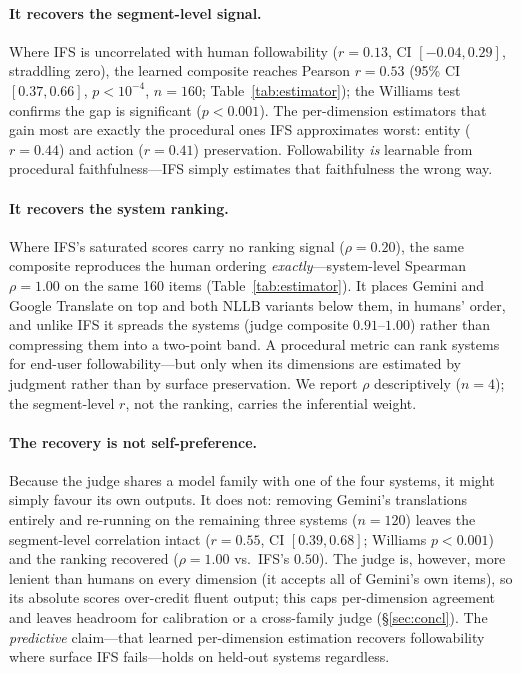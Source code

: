\documentclass[11pt]{article}
\begin{document}


\paragraph{It recovers the segment-level signal.} Where IFS is uncorrelated with human
followability ($r{=}0.13$, CI $[-0.04, 0.29]$, straddling zero), the learned composite reaches
Pearson $r{=}0.53$ (95\% CI $[0.37, 0.66]$, $p{<}10^{-4}$, $n{=}160$; Table~\ref{tab:estimator});
the Williams test confirms the gap is significant ($p{<}0.001$). The per-dimension estimators that
gain most are exactly the procedural ones IFS approximates worst: entity ($r{=}0.44$) and action
($r{=}0.41$) preservation. Followability \emph{is} learnable from procedural faithfulness---IFS
simply estimates that faithfulness the wrong way.

\paragraph{It recovers the system ranking.} Where IFS's saturated scores carry no ranking signal
($\rho{=}0.20$), the same composite reproduces the human ordering \emph{exactly}---system-level
Spearman $\rho{=}1.00$ on the same 160 items (Table~\ref{tab:estimator}). It places Gemini and
Google Translate on top and both NLLB variants below them, in humans' order, and unlike IFS it
spreads the systems (judge composite $0.91$--$1.00$) rather than compressing them into a
two-point band. A procedural metric can rank systems for end-user followability---but only when
its dimensions are estimated by judgment rather than by surface preservation. We report $\rho$
descriptively ($n{=}4$); the segment-level $r$, not the ranking, carries the inferential weight.

\paragraph{The recovery is not self-preference.} Because the judge shares a model family with one
of the four systems, it might simply favour its own outputs. It does not: removing Gemini's
translations entirely and re-running on the remaining three systems ($n{=}120$) leaves the
segment-level correlation intact ($r{=}0.55$, CI $[0.39, 0.68]$; Williams $p{<}0.001$) and the
ranking recovered ($\rho{=}1.00$ vs.\ IFS's $0.50$). The judge is, however, more lenient than
humans on every dimension (it accepts all of Gemini's own items), so its absolute scores
over-credit fluent output; this caps per-dimension agreement and leaves headroom for calibration
or a cross-family judge (\S\ref{sec:concl}). The \emph{predictive} claim---that learned
per-dimension estimation recovers followability where surface IFS fails---holds on held-out
systems regardless.
\end{document}
